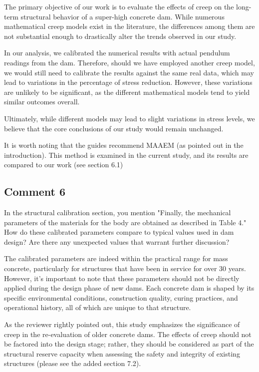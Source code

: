 \documentclass{ar2rc}
\begin{document}
	The primary objective of our work is to evaluate the effects of creep on the long-term structural behavior of a super-high concrete dam. While numerous mathematical creep models exist in the literature, the differences among them are not substantial enough to drastically alter the trends observed in our study.

	In our analysis, we calibrated the numerical results with actual pendulum readings from the dam. Therefore, should we have employed another creep model, we would still need to calibrate the results against the same real data, which may lead to variations in the percentage of stress reduction. However, these variations are unlikely to be significant, as the different mathematical models tend to yield similar outcomes overall.

	Ultimately, while different models may lead to slight variations in stress levels, we believe that the core conclusions of our study would remain unchanged.
	
	It is worth noting that the guides recommend MAAEM (as pointed out in the introduction). This method is examined in the current study, and its results are compared to our work (see section 6.1)
		
	\subsection{Comment 6}
	\RC In the structural calibration section, you mention "Finally, the mechanical parameters of the materials for the body are obtained as described in Table 4." How do these calibrated parameters compare to typical values used in dam design? Are	there any unexpected values that warrant further discussion?
		
	\AR The calibrated parameters are indeed within the practical range for mass concrete, particularly for structures that have been in service for over 30 years. However, it's important to note that these parameters should not be directly applied during the design phase of new dams. Each concrete dam is shaped by its specific environmental conditions, construction quality, curing practices, and operational history, all of which are unique to that structure.
	
	As the reviewer rightly pointed out, this study emphasizes the significance of creep in the re-evaluation of older concrete dams. The effects of creep should not be factored into the design stage; rather, they should be considered as part of the structural reserve capacity when assessing the safety and integrity of existing structures (please see the added section 7.2).
	
\end{document}
